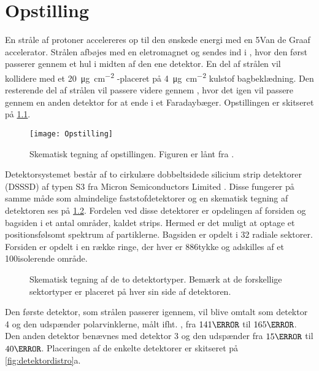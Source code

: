 \chapter{Opstilling}
\label{cha:opstilling}

En stråle af protoner accelereres op til den ønskede energi med en 5\MV Van de Graaf
accelerator. Strålen afbøjes med en eletromagnet og sendes ind i \beamline, hvor den først passerer
gennem et hul i midten af den ene detektor. En del af strålen vil kollidere med et
\SI[per-mode = symbol]{20}{\micro\gram\per\cm\squared} \Bor-\target placeret på
\SI[per-mode = symbol]{4}{\micro\gram\per\cm\squared} kulstof bagbeklædning.  Den resterende del af
strålen vil passere videre gennem \beamline, hvor det igen vil passere gennem en anden detektor for
at ende i et Faradaybæger. Opstillingen er skitseret på \cref{fig:opstilling}.
\begin{figure}[h]
  \centering
  \texttt{[image: Opstilling]}
  \caption{Skematisk tegning af opstillingen. Figuren er lånt fra \cite{Knudsen}.}
  \label{fig:opstilling}
\end{figure}

Detektorsystemet består af to cirkulære dobbeltsidede silicium strip detektorer (DSSSD) af typen S3 fra Micron
Semiconductors Limited \cite{micron-s3}.  Disse fungerer på samme måde som almindelige
faststofdetektorer og en skematisk tegning af detektoren ses på \cref{fig:S3}.  Fordelen ved disse
detektorer er opdelingen af forsiden og bagsiden i et antal områder, kaldet strips. Hermed er det
muligt at optage et positionsfølsomt spektrum af partiklerne. Bagsiden er opdelt i 32 radiale
sektorer. Forsiden er opdelt i en række ringe, der hver er 886\um tykke og adskilles af et
100\um isolerende område.
\begin{figure}[hbt]
  \setlength{\textfloatsep}{0pt plus 1.0pt minus 2.0pt}
  \centering
  \hfill
  \caption{Skematisk tegning af de to detektortyper. Bemærk at de forskellige sektortyper er
    placeret på hver sin side af detektoren.}
  \label{fig:S3}
\end{figure}

Den første detektor, som strålen passerer igennem, vil blive omtalt som detektor 4 og den udspænder
polarvinklerne, målt ifht. \beamline, fra $141\degree$ til $165\degree$. Den anden detektor benævnes
med detektor 3 og den udspænder fra $15\degree$ til $40\degree$. Placeringen af de enkelte
detektorer er skitseret på \cref{fig:detektordistro}a.

